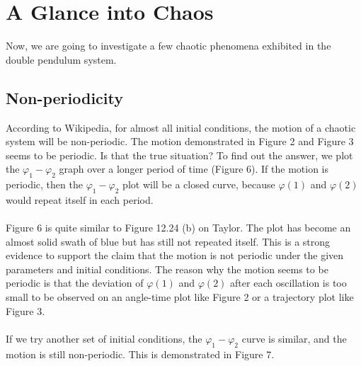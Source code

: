 \documentclass[11pt]{article}
\begin{document}
\section{A Glance into Chaos}
Now, we are going to investigate a few chaotic phenomena exhibited in the double pendulum system.
\subsection{Non-periodicity}
According to Wikipedia\cite{Wiki}, for almost all initial conditions, the motion of a chaotic system will be non-periodic.
The motion demonstrated in Figure 2 and Figure 3 seems to be periodic. Is that the true situation? To find out the answer, we plot
the \(\varphi_1-\varphi_2\) graph over a longer period of time (Figure 6). If the motion is periodic, then the \(\varphi_1-\varphi_2\) plot
will be a closed curve, because \(\varphi(1)\) and \(\varphi(2)\) would repeat itself in each period.\\
\\
Figure 6 is quite similar to Figure 12.24 (b) on Taylor\cite{Taylor}. The plot has become an almost solid swath of blue but has still
not repeated itself. This is a strong evidence to support the claim that the motion is not periodic under the given parameters
and initial conditions. The reason why the motion seems to be periodic is that the deviation of \(\varphi(1)\) and \(\varphi(2)\)
after each oscillation is too small to be observed on an angle-time plot like Figure 2 or a trajectory plot like Figure 3.\\
\\
If we try another set of initial conditions, the \(\varphi_1 - \varphi_2\) curve is similar, and the motion is still non-periodic.
This is demonstrated in Figure 7.
\end{document}
